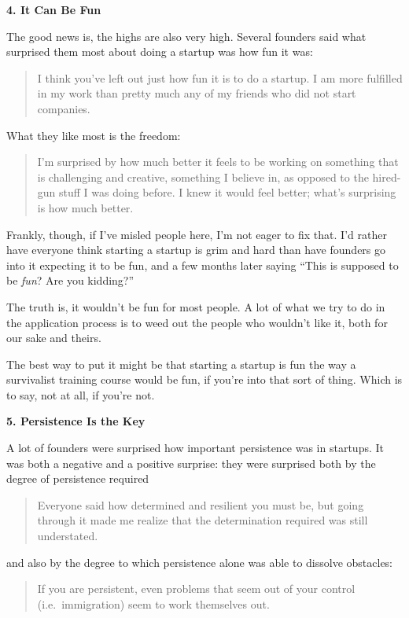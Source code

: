 \textbf{4. It Can Be Fun}

The good news is, the highs are also very high. Several founders said
what surprised them most about doing a startup was how fun it was:

\begin{quote}
I think you've left out just how fun it is to do a startup. I am more
fulfilled in my work than pretty much any of my friends who did not
start companies.
\end{quote}

What they like most is the freedom:

\begin{quote}
I'm surprised by how much better it feels to be working on something
that is challenging and creative, something I believe in, as opposed to
the hired-gun stuff I was doing before. I knew it would feel better;
what's surprising is how much better.
\end{quote}

Frankly, though, if I've misled people here, I'm not eager to fix that.
I'd rather have everyone think starting a startup is grim and hard than
have founders go into it expecting it to be fun, and a few months later
saying ``This is supposed to be \emph{fun}? Are you kidding?''

The truth is, it wouldn't be fun for most people. A lot of what we try
to do in the application process is to weed out the people who wouldn't
like it, both for our sake and theirs.

The best way to put it might be that starting a startup is fun the way a
survivalist training course would be fun, if you're into that sort of
thing. Which is to say, not at all, if you're not.

\textbf{5. Persistence Is the Key}

A lot of founders were surprised how important persistence was in
startups. It was both a negative and a positive surprise: they were
surprised both by the degree of persistence required

\begin{quote}
Everyone said how determined and resilient you must be, but going
through it made me realize that the determination required was still
understated.
\end{quote}

and also by the degree to which persistence alone was able to dissolve
obstacles:

\begin{quote}
If you are persistent, even problems that seem out of your control
(i.e.~immigration) seem to work themselves out.
\end{quote}

